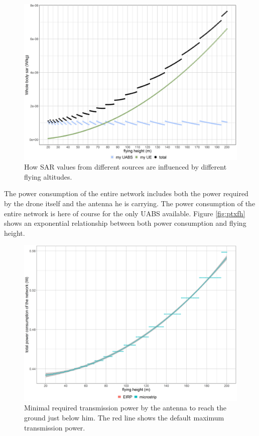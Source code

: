 \begin{figure}[]
  \includegraphics[width=\textwidth]{../results/s1/fhvssar.png}
  \caption{How SAR values from different sources are influenced by different flying altitudes.}
  \label{fig:s1_fhsar}
\end{figure}

The power consumption of the entire network includes both the power required by the drone itself and the antenna he is carrying.
The power consumption of the entire network is here of course for the only \gls{UABS} available. Figure \ref{fig:ptxfh} shows an 
exponential relationship between both power consumption and flying height. 

\begin{figure}[t]
  \centering
  \includegraphics[width=\textwidth]{../results/s1/fhvspc.png}
  \caption{Minimal required transmission power by the antenna to reach the ground just below him. The red line shows the default maximum transmission power.}
  \label{fig:fhvspc}
\end{figure}

